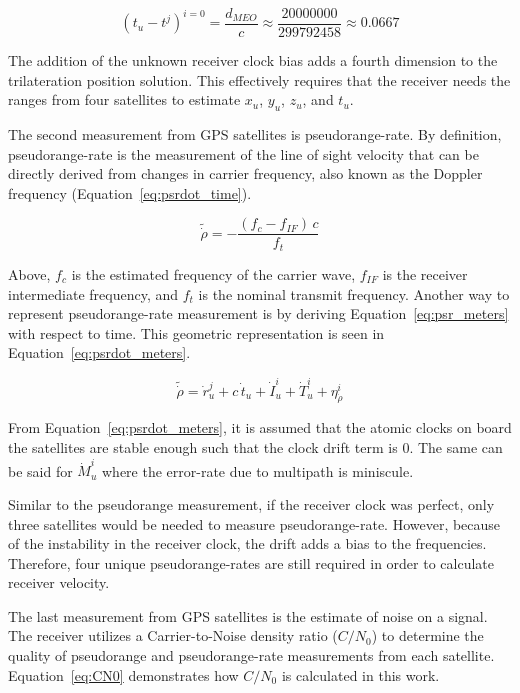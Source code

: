 \begin{equation}\label{eq:nominalOffset}
    {\left(t_u - t^{j} \right)}^{i = 0} = \frac{d_{MEO}}{c} \approx \frac{20000000}{299792458} \approx 0.0667
\end{equation}

The addition of the unknown receiver clock bias adds a fourth dimension to the trilateration position solution. This effectively requires that the receiver needs the ranges from four satellites to estimate \(x_u\), \(y_u\), \(z_u\), and \(t_u\).

The second measurement from GPS satellites is pseudorange-rate. By definition, pseudorange-rate is the measurement of the line of sight velocity that can be directly derived from changes in carrier frequency, also known as the Doppler frequency (Equation~\ref{eq:psrdot_time}).

\begin{equation}\label{eq:psrdot_time}
    \tilde{\dot{\rho}} = - \frac{\left(f_c - f_{IF}\right)\,c}{f_t}
\end{equation}

Above, \(f_c\) is the estimated frequency of the carrier wave, \(f_{IF}\) is the receiver intermediate frequency, and \(f_t\) is the nominal transmit frequency. Another way to represent pseudorange-rate measurement is by deriving Equation~\ref{eq:psr_meters} with respect to time. This geometric representation is seen in Equation~\ref{eq:psrdot_meters}.

\begin{equation}\label{eq:psrdot_meters}
    \tilde{\dot{\rho}} = \dot{r}_u^j + c\,\dot{t}_u + \dot{I}^i_u + \dot{T}^i_u + \eta^i_{\dot{\rho}}
\end{equation}

From Equation~\ref{eq:psrdot_meters}, it is assumed that the atomic clocks on board the satellites are stable enough such that the clock drift term is \(0\). The same can be said for \(\dot{M}^i_u\) where the error-rate due to multipath is miniscule.

Similar to the pseudorange measurement, if the receiver clock was perfect, only three satellites would be needed to measure pseudorange-rate. However, because of the instability in the receiver clock, the drift adds a bias to the frequencies. Therefore, four unique pseudorange-rates are still required in order to calculate receiver velocity.

The last measurement from GPS satellites is the estimate of noise on a signal. The receiver utilizes a Carrier-to-Noise density ratio (\(C/N_0\)) to determine the quality of pseudorange and pseudorange-rate measurements from each satellite. Equation~\ref{eq:CN0} demonstrates how \(C/N_0\) is calculated in this work.

